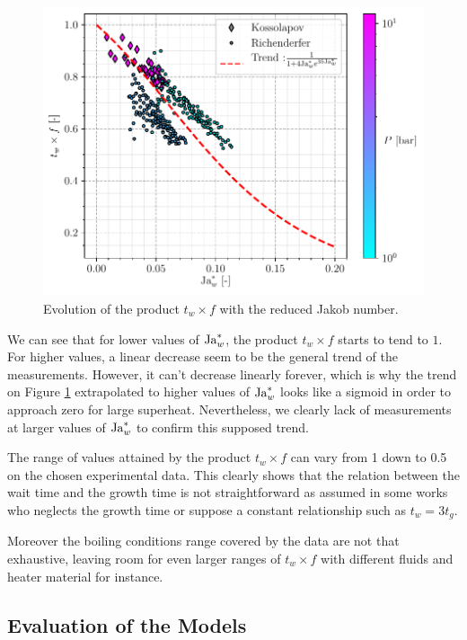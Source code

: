 \begin{figure}[!h]
\centering
\includegraphics[width=0.6\linewidth]{img/tw/Jawred_twf.pdf}
\caption{Evolution of the product $t_{w} \times f$ with the reduced Jakob number.}%
\label{fig:twf_Jawred}
\end{figure}

We can see that for lower values of $\mathrm{Ja}_{w}^{*}$, the product $t_{w} \times f$ starts to tend to $1$. For higher values, a linear decrease seem to be the general trend of the measurements. However, it can't decrease linearly forever, which is why the trend on Figure \ref{fig:twf_Jawred} extrapolated to higher values of $\mathrm{Ja}_{w}^{*}$ looks like a sigmoid in order to approach zero for large superheat. Nevertheless, we clearly lack of measurements at larger values of $\mathrm{Ja}_{w}^{*}$ to confirm this supposed trend.

\npar

\begin{remark*}{}
The range of values attained by the product $t_{w} \times f$ can vary from 1 down to 0.5 on the chosen experimental data. This clearly shows that the relation between the wait time and the growth time is not straightforward as assumed in some works who neglects the growth time or suppose a constant relationship such as $t_{w}=3t_{g}$\cite{chi-yeh_mechanism_1965}.

\npar
Moreover the boiling conditions range covered by the data are not that exhaustive, leaving room for even larger ranges of $t_{w} \times f$ with different fluids and heater material for instance.
\end{remark*}

\subsection{Evaluation of the Models}

